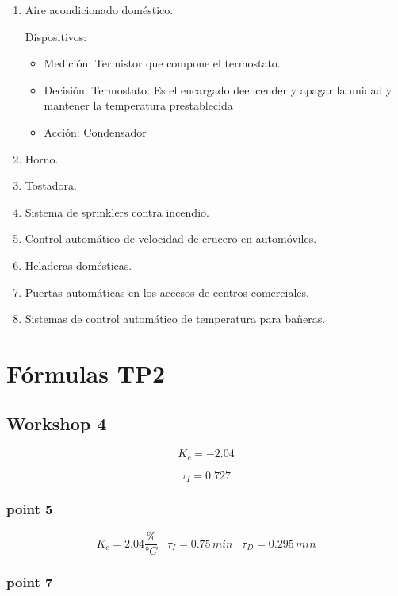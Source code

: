 \begin{enumerate}
    \item Aire acondicionado doméstico.

Dispositivos:

\begin{itemize}
    \item Medición: Termistor que compone el termostato.
    \item Decisión: Termostato. Es el encargado deencender y apagar la unidad y mantener la temperatura prestablecida
    \item Acción: Condensador
\end{itemize}



    \item Horno.
    \item Tostadora.
    \item Sistema de sprinklers contra incendio.
    \item Control automático de velocidad de crucero en automóviles.
    \item Heladeras domésticas.
    \item Puertas automáticas en los accesos de centros comerciales.
    \item Sistemas de control automático de temperatura para bañeras.
\end{enumerate}

\section{Fórmulas TP2}

\subsection{Workshop 4}

$$ K_{c}= -2.04 $$

$$ \tau_{I}= 0.727 $$

\subsubsection{point 5}

$$ K_{c}= 2.04 \frac{\%}{°C} \, \, \, \, \, \tau_{I}= 0.75 \, min \, \, \, \, \, \tau_{D}= 0.295 \, min$$

\subsubsection{point 7}

